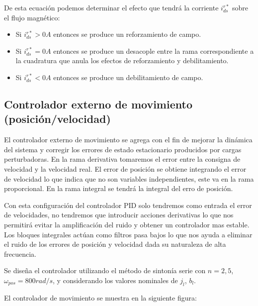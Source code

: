 \documentclass{article}
\begin{document}


De esta ecuación podemos determinar el efecto que tendrá la corriente $i_{ds}^{r*}$ sobre el flujo magnético:

\begin{itemize}
    \item Si $i_{ds}^{r*} > 0 A$ entonces se produce un reforzamiento de campo.
    \item Si $i_{ds}^{r*} = 0 A$ entonces se produce un desacople entre la rama correspondiente a 
    la cuadratura que anula los efectos de reforzamiento y debilitamiento.
    \item Si $i_{ds}^{r*} < 0 A$ entonces se produce un debilitamiento de campo.
\end{itemize}


\subsection{Controlador externo de movimiento (posición/velocidad)}

El controlador externo de movimiento se agrega con el fin de mejorar la dinámica del sistema y corregir los
errores de estado estacionario producidos por cargas perturbadoras. En la rama derivativa tomaremos el 
error entre la consigna de velocidad y la velocidad real. El error de posición se obtiene integrando el 
error de velocidad lo que indica que no son variables independientes, este va en la rama proporcional.
En la rama integral se tendrá la integral del erro de posición. 

Con esta configuración del controlador PID solo tendremos como entrada el error de velocidades, no tendremos
que introducir acciones derivativas lo que nos permitirá evitar la amplificación del ruido y obtener un 
controlador mas estable. Los bloques integrales actúan como filtros pasa bajos lo que nos ayuda a eliminar
el ruido de los errores de posición y velocidad dada su naturaleza de alta frecuencia.

Se diseña el controlador utilizando el método de sintonía serie con $n = 2,5$, $\omega_{pos} = 800 rad/s$, y
considerando los valores nominales de $j_l$, $b_l$. 

El controlador de movimiento se muestra en la siguiente figura: 

\end{document}

